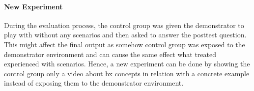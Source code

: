 \paragraph{New Experiment}
During the evaluation process, the control group was given the demonstrator to play with without any scenarios and then asked to answer the posttest question. This might affect the final output as somehow control group was exposed to the demonstrator environment and can cause the same effect what treated experienced with scenarios. Hence, a new experiment can be done by showing the control group only a video about bx concepts in relation with a concrete example instead of exposing them to the demonstrator environment.




